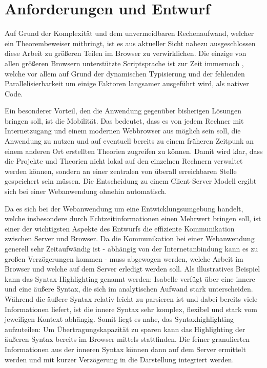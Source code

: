 \chapter{Anforderungen und Entwurf}
\label{sec:draft}

Auf Grund der Komplexität und dem unvermeidbaren Rechenaufwand, welcher ein Theorembeweiser
mitbringt, ist es aus aktueller Sicht nahezu ausgeschlossen diese Arbeit zu größeren Teilen im
Browser zu verwirklichen. Die einzige von allen größeren Browsern unterstützte Scriptsprache ist zur
Zeit immernoch , welche vor allem auf Grund der dynamischen Typisierung und der
fehlenden Parallelisierbarkeit um einige Faktoren langsamer ausgeführt wird, als nativer Code.

Ein besonderer Vorteil, den die Anwendung gegenüber bisherigen Lösungen bringen soll, ist die
Mobilität. Das bedeutet, dass es von jedem Rechner mit Internetzugang und einem modernen Webbrowser
aus möglich sein soll, die Anwendung zu nutzen und auf eventuell bereits zu einem früheren Zeitpunk
an einem anderen Ort erstellten Theorien zugreifen zu können. Damit wird klar, dass die Projekte und
Theorien nicht lokal auf den einzelnen Rechnern verwaltet werden können, sondern an einer zentralen
von überall erreichbaren Stelle gespeichert sein müssen. Die Entscheidung zu einem Client-Server
Modell ergibt sich bei einer Webanwendung ohnehin automatisch.

Da es sich bei der Webanwendung um eine Entwicklungsumgebung handelt, welche insbesondere durch
Echtzeitinformationen einen Mehrwert bringen soll, ist einer der wichtigsten Aspekte des Entwurfs
die effiziente Kommunikation zwischen Server und Browser. Da die Kommunikation bei einer
Webanwendung generell sehr Zeitaufwändig ist - abhängig von der Internetanbindung kann es zu großen
Verzögerungen kommen - muss abgewogen werden, welche Arbeit im Browser und welche auf dem Server
erledigt werden soll. Als illustratives Beispiel kann das Syntax-Highlighting genannt werden:
Isabelle verfügt über eine innere und eine äußere Syntax, die sich im analytischen Aufwand stark
unterscheiden. Während die äußere Syntax relativ leicht zu parsieren ist und dabei bereits viele
Informationen liefert, ist die innere Syntax sehr komplex, flexibel und stark vom jeweiligen Kontext
abhängig. Somit liegt es nahe, das Syntaxhighlighting aufzuteilen: Um Übertragungskapazität zu
sparen kann das Highlighting der äußeren Syntax bereits im Browser mittels  stattfinden. Die
feiner granulierten Informationen aus der inneren Syntax können dann auf dem Server ermittelt werden
und mit kurzer Verzögerung in die Darstellung integriert werden.



\clearpage



\clearpage

